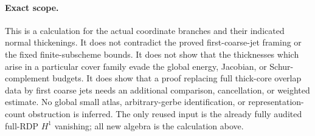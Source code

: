 \paragraph{Exact scope.}
This is a calculation for the actual coordinate branches and
their indicated normal thickenings.  It does not contradict the
proved first-coarse-jet framing or the fixed finite-subscheme
bounds.  It does not show that the thicknesses which arise in a
particular cover family evade the global energy, Jacobian, or
Schur-complement budgets.  It does show that a proof replacing
full thick-core overlap data by first coarse jets needs an
additional comparison, cancellation, or weighted estimate.
No global small atlas, arbitrary-gerbe identification, or
representation-count obstruction is inferred.  The only reused
input is the already fully audited full-RDP $H^1$ vanishing;
all new algebra is the calculation above.
